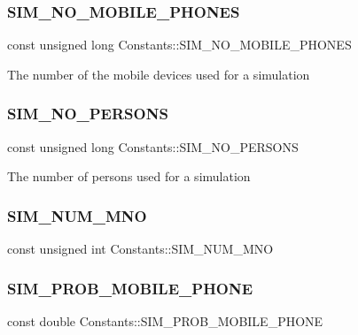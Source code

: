 \subsubsection{\texorpdfstring{SIM\_NO\_MOBILE\_PHONES}{SIM\_NO\_MOBILE\_PHONES}}
{\footnotesize\ttfamily const unsigned long Constants\+::\+S\+I\+M\+\_\+\+N\+O\+\_\+\+M\+O\+B\+I\+L\+E\+\_\+\+P\+H\+O\+N\+ES\hspace{0.3cm}{\ttfamily [static]}}

The number of the mobile devices used for a simulation \mbox{\label{class_constants_a627fe53a717da1ca017b2467fb1dd4df}} 
\subsubsection{\texorpdfstring{SIM\_NO\_PERSONS}{SIM\_NO\_PERSONS}}
{\footnotesize\ttfamily const unsigned long Constants\+::\+S\+I\+M\+\_\+\+N\+O\+\_\+\+P\+E\+R\+S\+O\+NS\hspace{0.3cm}{\ttfamily [static]}}

The number of persons used for a simulation \mbox{\label{class_constants_a763bdd9401295d6b691c93cf580e562a}} 
\subsubsection{\texorpdfstring{SIM\_NUM\_MNO}{SIM\_NUM\_MNO}}
{\footnotesize\ttfamily const unsigned int Constants\+::\+S\+I\+M\+\_\+\+N\+U\+M\+\_\+\+M\+NO\hspace{0.3cm}{\ttfamily [static]}}

\mbox{\label{class_constants_a8af75c6e731c2f425cce792b33786db7}} 
\subsubsection{\texorpdfstring{SIM\_PROB\_MOBILE\_PHONE}{SIM\_PROB\_MOBILE\_PHONE}}
{\footnotesize\ttfamily const double Constants\+::\+S\+I\+M\+\_\+\+P\+R\+O\+B\+\_\+\+M\+O\+B\+I\+L\+E\+\_\+\+P\+H\+O\+NE\hspace{0.3cm}{\ttfamily [static]}}

